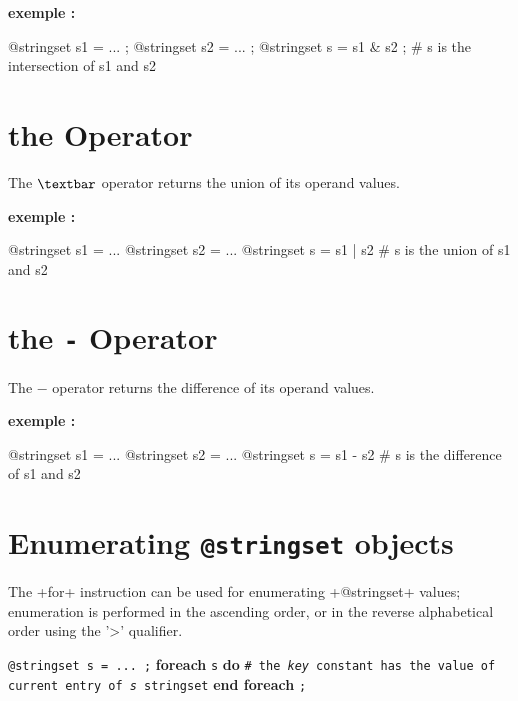 \textbf{exemple :}
\begin{galgas3}
@stringset s1 = ... ;
@stringset s2 = ... ;
@stringset s = s1 & s2 ; # s is the intersection of s1 and s2
\end{galgas3}






\section{the \texttt{\textbar} Operator}

The \emph{$\textbar$} operator returns the union of its operand values.

\textbf{exemple :}
\begin{galgas3}
@stringset s1 = ...
@stringset s2 = ...
@stringset s = s1 | s2 # s is the union of s1 and s2
\end{galgas3}






\section{the \texttt{-} Operator}

The \emph{$-$} operator returns the difference of its operand values.

\textbf{exemple :}
\begin{galgas3}
@stringset s1 = ...
@stringset s2 = ...
@stringset s = s1 - s2 # s is the difference of s1 and s2
\end{galgas3}








\section{Enumerating \texttt{@stringset} objects}


The \ggst+for+ instruction can be used for enumerating \ggst+@stringset+ values; enumeration is performed in the ascending order, or in the reverse alphabetical order using the '>' qualifier.

\texttt{@stringset s = ... ;}\newline
\textbf{foreach} \texttt {s} \textbf {do}\newline
\texttt{\# the \emph{key} constant has the value of current entry of \emph{s} stringset}\newline
\textbf{end foreach} \texttt{;}







